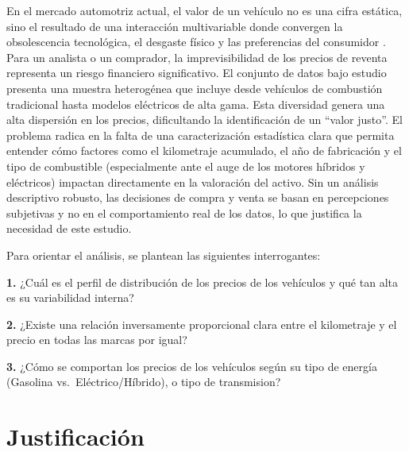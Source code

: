 \documentclass[oneside,11pt]{Latex/Classes/PhDthesisPSnPDF}
\begin{document}
En el mercado automotriz actual, el valor de un vehículo no es una cifra
estática, sino el resultado de una interacción multivariable donde
convergen la obsolescencia tecnológica, el desgaste físico y las
preferencias del consumidor \citep{han2024}. Para un analista o un
comprador, la imprevisibilidad de los precios de reventa representa un
riesgo financiero significativo. \newline \newline El conjunto de datos
bajo estudio presenta una muestra heterogénea que incluye desde
vehículos de combustión tradicional hasta modelos eléctricos de alta
gama. Esta diversidad genera una alta dispersión en los precios,
dificultando la identificación de un ``valor justo''. El problema radica
en la falta de una caracterización estadística clara que permita
entender cómo factores como el kilometraje acumulado, el año de
fabricación y el tipo de combustible (especialmente ante el auge de los
motores híbridos y eléctricos) impactan directamente en la valoración
del activo. \newline \newline Sin un análisis descriptivo robusto, las
decisiones de compra y venta se basan en percepciones subjetivas y no en
el comportamiento real de los datos, lo que justifica la necesidad de
este estudio.

Para orientar el análisis, se plantean las siguientes interrogantes:

\textbf{1.} ¿Cuál es el perfil de distribución de los precios de los
vehículos y qué tan alta es su variabilidad interna?

\textbf{2.} ¿Existe una relación inversamente proporcional clara entre
el kilometraje y el precio en todas las marcas por igual?

\textbf{3.} ¿Cómo se comportan los precios de los vehículos según su
tipo de energía (Gasolina vs.~Eléctrico/Híbrido), o tipo de transmision?

\section{Justificación}
\end{document}
